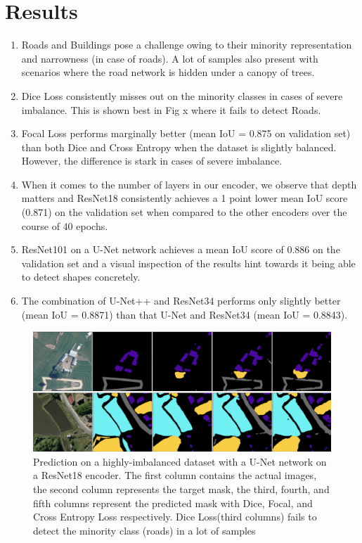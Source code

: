 \documentclass[conference]{IEEEtran}
\begin{document}
\section{Results}
\begin{enumerate}
    \item Roads and Buildings pose a challenge owing to their minority representation and narrowness (in case of roads). A lot of samples also present with scenarios where the road network is hidden under a canopy of trees.
    \item Dice Loss consistently misses out on the minority classes in cases of severe imbalance. This is shown best in Fig x where it fails to detect Roads.
    \item Focal Loss performs marginally better (mean IoU = 0.875 on validation set) than both Dice and Cross Entropy when the dataset is slightly balanced. However, the difference is stark in cases of severe imbalance.
    \item When it comes to the number of layers in our encoder, we observe that depth matters and ResNet18 consistently achieves a 1 point lower mean IoU score (0.871) on the validation set when compared to the other encoders over the course of 40 epochs.
    \item ResNet101 on a U-Net network achieves a mean IoU score of 0.886 on the validation set and a visual inspection of the results hint towards it being able to detect shapes concretely.
    \item The combination of U-Net++ and ResNet34 performs only slightly better (mean IoU = 0.8871) than that U-Net and ResNet34 (mean IoU = 0.8843).
\end{enumerate}

\begin{figure}
    \includegraphics[]{images/no-roads-losses/no-roads-smaller.png}
    \caption{Prediction on a highly-imbalanced dataset with a U-Net network on a ResNet18 encoder. The first column contains the actual images, the second column represents the target mask, the third, fourth, and fifth columns represent the predicted mask with Dice, Focal, and Cross Entropy Loss respectively. Dice Loss(third columns) fails to detect the minority class (roads) in a lot of samples}
\end{figure}
\end{document}
